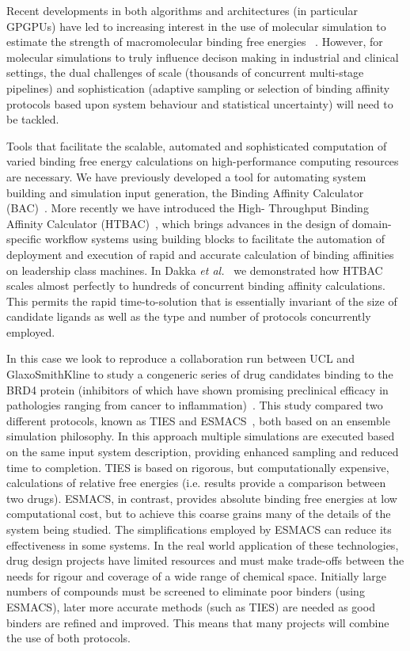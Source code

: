 Recent developments in both algorithms and architectures (in particular
GPGPUs) have led to increasing interest in the use of molecular simulation to
estimate the strength of macromolecular binding free energies
~\cite{DeVivo2016}. However, for molecular simulations to truly influence
decison making in industrial and clinical settings, the dual challenges of
scale (thousands of concurrent multi-stage pipelines) and sophistication
(adaptive sampling or selection of binding affinity protocols based upon
system behaviour and statistical uncertainty) will need to be
tackled.


Tools that facilitate the scalable, automated and sophisticated computation of
varied binding free energy calculations on high-performance computing
resources are necessary.
We have previously developed a tool for automating system building and 
simulation input generation, the Binding Affinity Calculator 
(BAC)~\cite{Sadiq2008}.
More recently we have introduced the High-
Throughput Binding Affinity Calculator (HTBAC)~\cite{dakka2017}, which brings
advances in the design of domain-specific workflow systems using building
blocks to facilitate the automation of deployment and execution of rapid and accurate calculation of binding affinities on leadership class machines. 
In Dakka \textit{et al.}~\cite{dakka2017} we demonstrated how HTBAC scales 
almost perfectly to hundreds of concurrent binding affinity calculations. 
This permits the rapid time-to-solution that is essentially invariant of the 
size of candidate ligands as well as the type and number of protocols 
concurrently employed.

In this case we look to reproduce a collaboration run between UCL and
GlaxoSmithKline to study a congeneric series of drug candidates binding to the
BRD4 protein (inhibitors of which have shown promising preclinical efficacy in
pathologies ranging from cancer to inflammation)~\cite{Wan2017brd4}. This
study compared two different protocols, known as TIES and ESMACS~\cite{Wan2017brd4,    Bhati2017}, both based on an ensemble simulation philosophy. 
In this approach multiple simulations
are executed based on the same input system description, providing enhanced
sampling and reduced time to completion. TIES is based on rigorous, but
computationally expensive, calculations of relative free energies (i.e.
results provide a comparison between two drugs). 
ESMACS, in contrast, provides
absolute binding free energies at low computational cost, but to achieve this
coarse grains many of the details of the system being studied. 
The simplifications employed by ESMACS can reduce its effectiveness in some
systems. 
In the real world application of these technologies, drug
design projects have limited resources and must make trade-offs between the
needs for rigour and coverage of a wide range of chemical space. Initially
large numbers of compounds must be screened to eliminate poor binders (using
ESMACS), later more accurate methods (such as TIES) are needed as good binders
are refined and improved. This means that many projects will combine the use
of both protocols.

